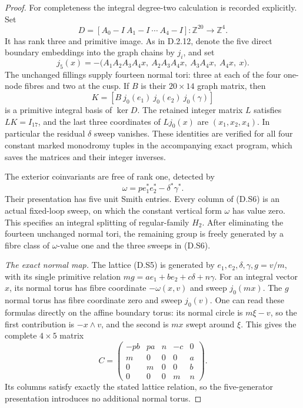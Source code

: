 \begin{proof}
For completeness the integral degree-two calculation is
recorded explicitly. Set
\[
 D=[A_0-I\ A_1-I\ \cdots\ A_4-I]:\mathbb Z^{20}\to\mathbb Z^4.
\]
It has rank three and primitive image. As in D.2.12, denote
the five direct boundary embeddings into the graph chains by
$j_i$, and set
\[
 j_5(x)=-\bigl(A_1A_2A_3A_4x,\ A_2A_3A_4x,
                      \ A_3A_4x,\ A_4x,\ x\bigr).
\]
The unchanged fillings supply fourteen normal tori: three
at each of the four one-node fibres and two at the cusp.
If $B$ is their $20\times14$ graph matrix, then
\[
 K=[B\ j_0(e_1)\ j_0(e_2)\ j_0(\gamma)]
 \tag{D.S6}
\]
is a primitive integral basis of $\ker D$.
The retained integer matrix $L$ satisfies $LK=I_{17}$,
and the last three coordinates of $Lj_0(x)$ are
$(x_1,x_2,x_4)$. In particular the residual $\delta$ sweep
vanishes. These identities are verified for all four
constant marked monodromy tuples in the accompanying exact
program, which saves the matrices and their integer inverses.

The exterior coinvariants are free of rank one, detected by
\[
 \omega=p e_1^*e_2^*-\delta^*\gamma^*.
\]
Their presentation has five unit Smith entries. Every column
of (D.S6) is an actual fixed-loop sweep, on which the constant
vertical form $\omega$ has value zero. This specifies an
integral splitting of regular-family $H_2$.
After eliminating the fourteen unchanged normal tori,
the remaining group is freely generated by a fibre class
of $\omega$-value one and the three sweeps in (D.S6).

\emph{The exact normal map.}
The lattice (D.S5) is generated by $e_1,e_2,\delta,\gamma,g=v/m$,
with its single primitive relation
$mg=a e_1+b e_2+c\delta+n\gamma$.
For an integral vector $x$, its normal torus has fibre
coordinate $-\omega(x,v)$ and sweep $j_0(mx)$.
The $g$ normal torus has fibre coordinate zero and sweep
$j_0(v)$. One can read these formulas directly on the
affine boundary torus: its normal circle is $m\xi-v$,
so the first contribution is $-x\wedge v$, and the second
is $mx$ swept around $\xi$. This gives the complete
$4\times5$ matrix
\[
 C=\begin{pmatrix}
 -pb&pa&n&-c&0\\
 m&0&0&0&a\\
 0&m&0&0&b\\
 0&0&0&m&n
 \end{pmatrix}.
 \tag{D.S7}
\]
Its columns satisfy exactly the stated lattice relation,
so the five-generator presentation introduces no additional
normal torus.


\end{proof}
